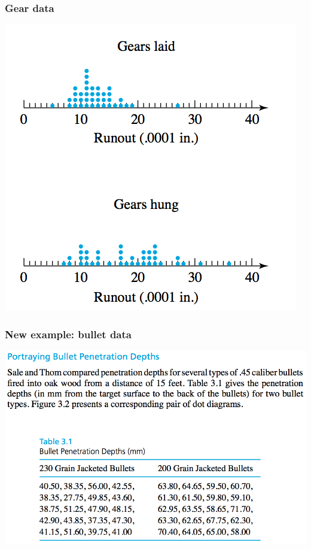 \documentclass[handout]{beamer}\usepackage{graphicx, color}
\numberwithin{equation}{section}
\begin{document}
\begin{frame}
\frametitle{Gear data}
\begin{center}
 \includegraphics{../../fig/geardot.png}
\end{center}
\end{frame}

\begin{frame}
\frametitle{New example: bullet data}
\begin{center}
 \includegraphics{../../fig/bulletdata.png}
\end{center}
\end{frame}
\end{document}
